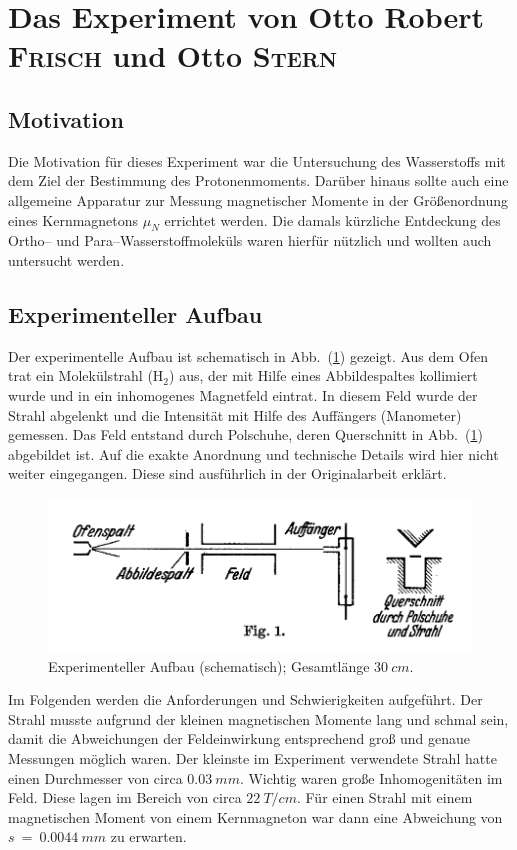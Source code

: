 \documentclass[sn-mathphys-num,iicol]{sn-jnl}
\theoremstyle{thmstyleone}
\theoremstyle{thmstyletwo}
\theoremstyle{thmstylethree}
\begin{document}
\section{Das Experiment von Otto Robert \textsc{Frisch} und Otto \textsc{Stern}}
\subsection{Motivation}
Die Motivation für dieses Experiment war die Untersuchung des Wasserstoffs mit dem Ziel der Bestimmung des Protonenmoments.
Darüber hinaus sollte auch eine allgemeine Apparatur zur Messung magnetischer Momente in der Größenordnung eines Kernmagnetons $\mu _N$ errichtet werden.
Die damals kürzliche Entdeckung des Ortho-- und Para--Wasserstoffmoleküls waren hierfür nützlich und wollten auch untersucht werden.

\subsection{Experimenteller Aufbau}
\noindent Der experimentelle Aufbau ist schematisch in Abb.\ (\ref{fig:experimenteller_aufbau_frisch_stern}) gezeigt.
Aus dem Ofen trat ein Molekülstrahl ($\text{H}_2$) aus, der mit Hilfe eines Abbildespaltes kollimiert wurde und in ein inhomogenes Magnetfeld eintrat.
In diesem Feld wurde der Strahl abgelenkt und die Intensität mit Hilfe des Auffängers (Manometer) gemessen.
Das Feld entstand durch Polschuhe, deren Querschnitt in Abb.\ (\ref{fig:experimenteller_aufbau_frisch_stern}) abgebildet ist.
Auf die exakte Anordnung und technische Details wird hier nicht weiter eingegangen.
Diese sind ausführlich in der Originalarbeit\cite{FrischStern1933} erklärt.
\begin{figure}[t]
        \includegraphics[width=.5\textwidth]{../vortrag/prosi_versuchsaufbau_mag_moment.png}
        \caption{Experimenteller Aufbau (schematisch); Gesamtlänge $\SI{30}{cm}$.\cite{FrischStern1933}}\label{fig:experimenteller_aufbau_frisch_stern}
\end{figure}

Im Folgenden werden die Anforderungen und Schwierigkeiten aufgeführt.
Der Strahl musste aufgrund der kleinen magnetischen Momente lang und schmal sein, damit die Abweichungen der Feldeinwirkung entsprechend groß und genaue Messungen möglich waren.
Der kleinste im Experiment verwendete Strahl hatte einen Durchmesser von circa $\SI{0.03}{mm}$.
Wichtig waren große Inhomogenitäten im Feld.
Diese lagen im Bereich von circa $\SI{22}{T/cm}$.
Für einen Strahl mit einem magnetischen Moment von einem Kernmagneton war dann eine Abweichung von $s~=~\SI{0.0044}{mm}$ zu erwarten.
\end{document}
